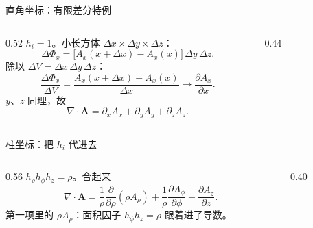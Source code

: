 \documentclass[fontset=windows, chinese, 10pt, xcolor=dvipsnames]{beamer}
\begin{document}
\begin{frame}{直角坐标：有限差分特例}
  \begin{columns}[c]
    \begin{column}{0.52\textwidth}
      {\small
      $h_i=1$。小长方体 $\Delta x\times\Delta y\times\Delta z$：
      \begin{equation*}
        \Delta\Phi_x
        =\bigl[A_x(x+\Delta x)-A_x(x)\bigr]
        \,\Delta y\,\Delta z.
      \end{equation*}
      除以 $\Delta V=\Delta x\,\Delta y\,\Delta z$：
      \begin{equation*}
        \frac{\Delta\Phi_x}{\Delta V}
        =\frac{A_x(x+\Delta x)-A_x(x)}{\Delta x}
        \to\frac{\partial A_x}{\partial x}.
      \end{equation*}
      $y$、$z$ 同理，故
      \begin{equation*}
        \nabla\cdot\mathbf{A}
        =\partial_x A_x+\partial_y A_y+\partial_z A_z.
      \end{equation*}
      }
    \end{column}
    \begin{column}{0.44\textwidth}
      \centering
      \scalebox{0.82}{}
    \end{column}
  \end{columns}
\end{frame}

\begin{frame}{柱坐标：把 $h_i$ 代进去}
  \begin{columns}[c]
    \begin{column}{0.56\textwidth}
      $h_{\rho}h_{\phi}h_z=\rho$。合起来
      \begin{equation*}
        \boxed{\displaystyle
          \nabla\cdot\mathbf{A}
          =\frac{1}{\rho}\frac{\partial}{\partial\rho}(\rho A_{\rho})
            +\frac{1}{\rho}\frac{\partial A_{\phi}}{\partial\phi}
            +\frac{\partial A_z}{\partial z}.}
      \end{equation*}
      第一项里的 $\rho A_{\rho}$：面积因子 $h_{\phi}h_z=\rho$ 跟着进了导数。
    \end{column}
    \begin{column}{0.40\textwidth}
      \centering
      \scalebox{0.85}{}
    \end{column}
  \end{columns}
\end{frame}
\end{document}

